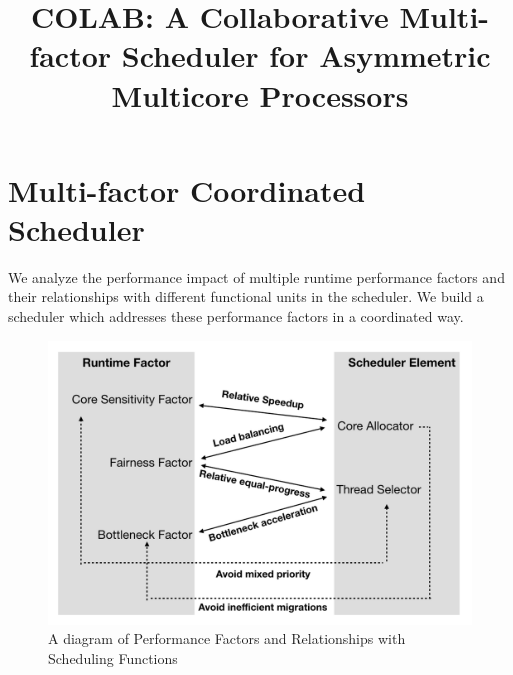 \documentclass{sig-alternate}
\title{COLAB: A Collaborative Multi-factor Scheduler for Asymmetric Multicore Processors}
\author{}
\begin{document}
\maketitle
\thispagestyle{firstpage}
\pagestyle{plain}





\section{Multi-factor Coordinated Scheduler}
We analyze the performance impact of multiple runtime performance factors and their relationships with different functional units in the scheduler. We build a scheduler which addresses these performance factors in a coordinated way.

\begin{figure}
\centering
\includegraphics[scale=0.45]{figures/mfa.pdf}
\caption{A diagram of Performance Factors and Relationships with Scheduling Functions}
\label{figure:f1}
\end{figure} 
\end{document}
